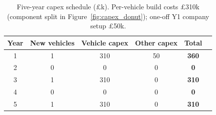 \begin{table}[H]
\centering
\small
\caption{Five-year capex schedule (\pounds k). Per-vehicle build costs 
\pounds310k (component split in Figure~\ref{fig:capex_donut}); 
one-off Y1 company setup \pounds50k.}
\label{tab:capex_schedule}
\begin{tabular}{cccccc}
\toprule
\textbf{Year} & \textbf{New vehicles} & \textbf{Vehicle capex} & \textbf{Other capex} & \textbf{Total} \\
\midrule
1 & 1 & 310 & 50 & \textbf{360} \\
2 & 0 & 0 & 0 & \textbf{0} \\
3 & 1 & 310 & 0 & \textbf{310} \\
4 & 0 & 0 & 0 & \textbf{0} \\
5 & 1 & 310 & 0 & \textbf{310} \\
\bottomrule
\end{tabular}
\end{table}
